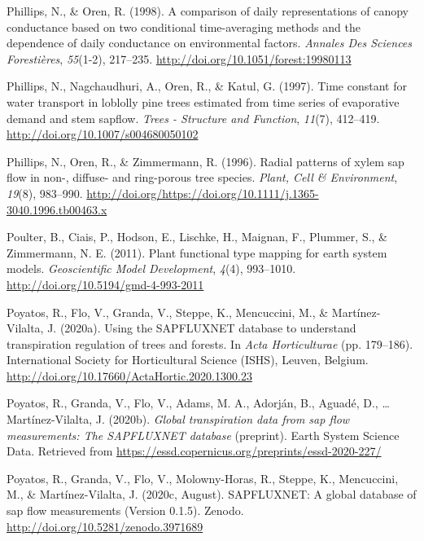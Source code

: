 \documentclass[11pt,twoside]{reedthesis}
\begin{document}
\hypertarget{ref-phillips_comparison_1998}{}
Phillips, N., \& Oren, R. (1998). A comparison of daily representations
of canopy conductance based on two conditional time-averaging methods
and the dependence of daily conductance on environmental factors.
\emph{Annales Des Sciences Forestières}, \emph{55}(1-2), 217--235.
\url{http://doi.org/10.1051/forest:19980113}

\hypertarget{ref-Phillips1997}{}
Phillips, N., Nagchaudhuri, A., Oren, R., \& Katul, G. (1997). Time
constant for water transport in loblolly pine trees estimated from time
series of evaporative demand and stem sapflow. \emph{Trees - Structure
and Function}, \emph{11}(7), 412--419.
\url{http://doi.org/10.1007/s004680050102}

\hypertarget{ref-Phillips1996}{}
Phillips, N., Oren, R., \& Zimmermann, R. (1996). Radial patterns of
xylem sap flow in non-, diffuse- and ring-porous tree species.
\emph{Plant, Cell \& Environment}, \emph{19}(8), 983--990.
\url{http://doi.org/https://doi.org/10.1111/j.1365-3040.1996.tb00463.x}

\hypertarget{ref-Poulter2011}{}
Poulter, B., Ciais, P., Hodson, E., Lischke, H., Maignan, F., Plummer,
S., \& Zimmermann, N. E. (2011). Plant functional type mapping for earth
system models. \emph{Geoscientific Model Development}, \emph{4}(4),
993--1010. \url{http://doi.org/10.5194/gmd-4-993-2011}

\hypertarget{ref-poyatos2020b}{}
Poyatos, R., Flo, V., Granda, V., Steppe, K., Mencuccini, M., \&
Martínez-Vilalta, J. (2020a). Using the SAPFLUXNET database to
understand transpiration regulation of trees and forests. In \emph{Acta
Horticulturae} (pp. 179--186). International Society for Horticultural
Science (ISHS), Leuven, Belgium.
\url{http://doi.org/10.17660/ActaHortic.2020.1300.23}

\hypertarget{ref-poyatos_global_2020}{}
Poyatos, R., Granda, V., Flo, V., Adams, M. A., Adorján, B., Aguadé, D.,
\ldots{} Martínez-Vilalta, J. (2020b). \emph{Global transpiration data
from sap flow measurements: The SAPFLUXNET database} (preprint). Earth
System Science Data. Retrieved from
\url{https://essd.copernicus.org/preprints/essd-2020-227/}

\hypertarget{ref-rafael_poyatos_2020}{}
Poyatos, R., Granda, V., Flo, V., Molowny-Horas, R., Steppe, K.,
Mencuccini, M., \& Martínez-Vilalta, J. (2020c, August). SAPFLUXNET: A
global database of sap flow measurements (Version 0.1.5). Zenodo.
\url{http://doi.org/10.5281/zenodo.3971689}
\end{document}
